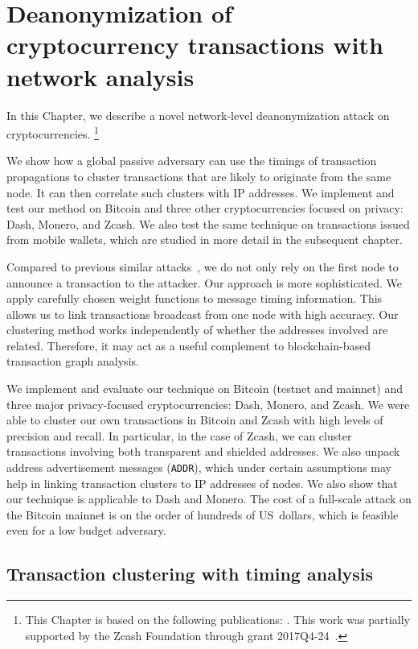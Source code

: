 \chapter{Deanonymization of cryptocurrency transactions with network analysis} %

\label{Chapter03Clustering}

In this Chapter, we describe a novel network-level deanonymization attack on cryptocurrencies.
\footnote{This Chapter is based on the following publications: \cite{Biryukov2019a, Biryukov2019b}. This work was partially supported by the Zcash Foundation through grant 2017Q4-24~\cite{Feher2017}.}

We show how a global passive adversary can use the timings of transaction propagations to cluster transactions that are likely to originate from the same node.
It can then correlate such clusters with IP addresses.
We implement and test our method on Bitcoin and three other cryptocurrencies focused on privacy: Dash, Monero, and Zcash.
We also test the same technique on transactions issued from mobile wallets, which are studied in more detail in the subsequent chapter.

Compared to previous similar attacks~\cite{Biryukov2014, Koshy2014}, we do not only rely on the first node to announce a transaction to the attacker.
Our approach is more sophisticated.
We apply carefully chosen weight functions to message timing information.
This allows us to link transactions broadcast from one node with high accuracy.
Our clustering method works independently of whether the addresses involved are related.
Therefore, it may act as a useful complement to blockchain-based transaction graph analysis.

We implement and evaluate our technique on Bitcoin (testnet and mainnet) and three major privacy-focused cryptocurrencies: Dash, Monero, and Zcash.
We were able to cluster our own transactions in Bitcoin and Zcash with high levels of precision and recall.
In particular, in the case of Zcash, we can cluster transactions involving both transparent and shielded addresses.
We also unpack address advertisement messages (\texttt{ADDR}), which under certain assumptions may help in linking transaction clusters to IP addresses of nodes.
We also show that our technique is applicable to Dash and Monero.
The cost of a full-scale attack on the Bitcoin mainnet is on the order of hundreds of US~dollars, which is feasible even for a low budget adversary.


\section{Transaction clustering with timing analysis}  \label{sec:Ch03Ourapproach}

